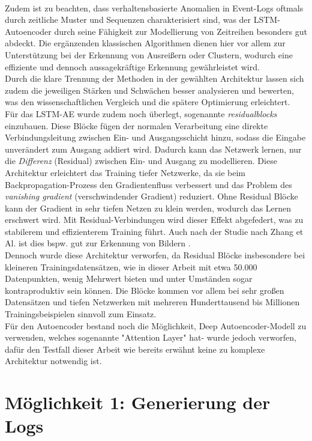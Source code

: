 \documentclass[a4paper,12pt]{article}
\begin{document}
	\\[0.5em]
	Zudem ist zu beachten, dass verhaltensbasierte Anomalien in Event-Logs oftmals durch zeitliche Muster und Sequenzen charakterisiert sind, was der LSTM-Autoencoder durch seine Fähigkeit zur Modellierung von Zeitreihen besonders gut abdeckt. Die ergänzenden klassischen Algorithmen dienen hier vor allem zur Unterstützung bei der Erkennung von Ausreißern oder Clustern, wodurch eine effiziente und dennoch aussagekräftige Erkennung gewährleistet wird.
	\\[0.5em]
	Durch die klare Trennung der Methoden in der gewählten Architektur lassen sich zudem die jeweiligen Stärken und Schwächen besser analysieren und bewerten, was den wissenschaftlichen Vergleich und die spätere Optimierung erleichtert.
	\\[0.5em]
	Für das LSTM-AE wurde zudem noch überlegt, sogenannte \textit{\gls{residualblock}s} einzubauen. Diese Blöcke fügen der normalen Verarbeitung eine direkte Verbindungsleitung zwischen Ein- und Ausgangsschicht hinzu, sodass die Eingabe unverändert zum Ausgang addiert wird. Dadurch kann das Netzwerk lernen, nur die \textit{Differenz} (Residual) zwischen Ein- und Ausgang zu modellieren. Diese Architektur erleichtert das Training tiefer Netzwerke, da sie beim Backpropagation-Prozess den Gradientenfluss verbessert und das Problem des \textit{vanishing gradient} (verschwindender Gradient) reduziert. Ohne Residual Blöcke kann der Gradient in sehr tiefen Netzen zu klein werden, wodurch das Lernen erschwert wird. Mit Residual-Verbindungen wird dieser Effekt abgefedert, was zu stabilerem und effizienterem Training führt. Auch nach der Studie nach Zhang et Al. ist dies bspw. gut zur Erkennung von Bildern \cite{he2016deep}.
	\\[0.5em]
	Dennoch wurde diese Architektur verworfen, da Residual Blöcke insbesondere bei kleineren Trainingsdatensätzen, wie in dieser Arbeit mit etwa 50.000 Datenpunkten, wenig Mehrwert bieten und unter Umständen sogar kontraproduktiv sein können. Die Blöcke kommen vor allem bei sehr großen Datensätzen und tiefen Netzwerken mit mehreren Hunderttausend bis Millionen Trainingsbeispielen sinnvoll zum Einsatz.
	\\[0.5em]
	Für den Autoencoder bestand noch die Möglichkeit, Deep Autoencoder-Modell zu verwenden, welches sogenannte "Attention Layer" \cite{najafi2023attention} hat- wurde jedoch verworfen, dafür den Testfall dieser Arbeit wie bereits erwähnt keine zu komplexe Architektur notwendig ist.

	\section{Möglichkeit 1: Generierung der Logs}
\end{document}
